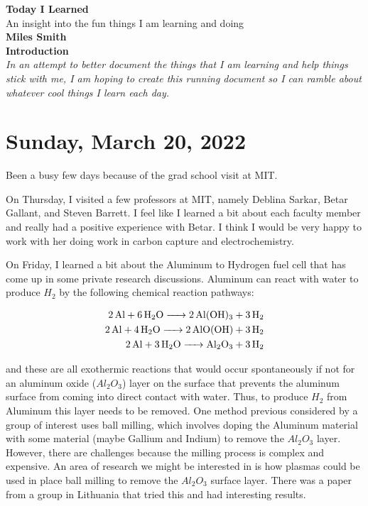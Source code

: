 \documentclass[12pt]{article}
\begin{document}
\begin{center}
\huge{\textbf{Today I Learned}}\\
\large{An insight into the fun things I am learning and doing}\\

\vspace*{0.5cm}
\textbf{Miles Smith}\\

\vspace*{1cm}
\textbf{Introduction}\\
\textit{In an attempt to better document the things that I am learning and help things stick with me, I am hoping to create this running document so I can ramble about whatever cool things I learn each day.}\\
\vspace*{2cm}
\clearpage

\end{center}

\section{Sunday, March 20, 2022}

\par
Been a busy few days because of the grad school visit at MIT. 

\par
On Thursday, I visited a few professors at MIT, namely Deblina Sarkar, Betar Gallant, and Steven Barrett.  I feel like I learned a bit about each faculty member and really had a positive experience with Betar. I think I would be very happy to work with her doing work in carbon capture and electrochemistry. 

\par
On Friday, I learned a bit about the Aluminum to Hydrogen fuel cell that has come up in some private research discussions. Aluminum can react with water to produce $H_2$ by the following chemical reaction pathways: 

\begin{align}
\ce{2 Al + 6H_2O -> 2 Al(OH)_3 + 3H_2} \\
\ce{2 Al + 4H_2O -> 2 AlO(OH) + 3H_2} \\
\ce{2 Al + 3H_2O -> Al_2O_3 + 3H_2}
\end{align}

and these are all exothermic reactions that would occur spontaneously if not for an aluminum oxide ($Al_2O_3$) layer on the surface that prevents the aluminum surface from coming into direct contact with water. Thus, to produce $H_2$ from Aluminum this layer needs to be removed. One method previous considered by a group of interest uses ball milling, which involves doping the Aluminum material with some material (maybe Gallium and Indium) to remove the $Al_2O_3$ layer. However, there are challenges because the milling process is complex and expensive. An area of research we might be interested in is how plasmas could be used in place ball milling to remove the $Al_2O_3$ surface layer. There was a paper from a group in Lithuania that tried this and had interesting results.
\end{document}
